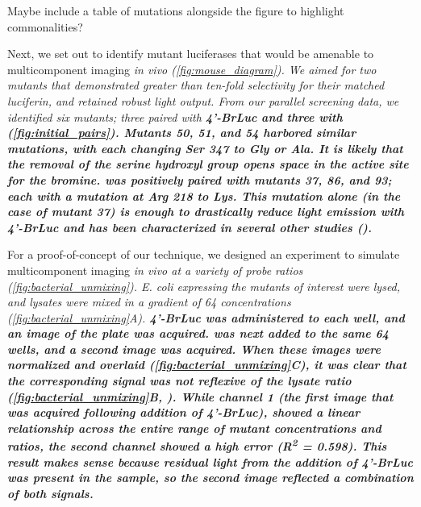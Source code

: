 \begin{thoughts}
  Maybe include a table of mutations alongside the figure to highlight commonalities?
\end{thoughts}

Next, we set out to identify mutant luciferases that would be amenable to multicomponent imaging \it{in vivo} (\autoref{fig:mouse_diagram}). We aimed for two mutants that demonstrated greater than ten-fold selectivity for their matched luciferin, and retained robust light output. From our parallel screening data, we identified six mutants; three paired with \bf{4'-BrLuc} and three with \dluc{} (\autoref{fig:initial_pairs}).
Mutants 50, 51, and 54 harbored similar mutations, with each changing Ser 347 to Gly or Ala. It is likely that the removal of the serine hydroxyl group opens space in the active site for the bromine.
\dluc{} was positively paired with mutants 37, 86, and 93; each with a mutation at Arg 218 to Lys. This mutation alone (in the case of mutant 37) is enough to drastically reduce light emission with \bf{4'-BrLuc} and has been characterized in several other studies ().

For a proof-of-concept of our technique, we designed an experiment to simulate multicomponent imaging \it{in vivo} at a variety of probe ratios (\autoref{fig:bacterial_unmixing}). \it{E. coli} expressing the mutants of interest were lysed, and lysates were mixed in a gradient of 64 concentrations (\autoref{fig:bacterial_unmixing}A). \bf{4'-BrLuc} was administered to each well, and an image of the plate was acquired. \dluciferin{} was next added to the same 64 wells, and a second image was acquired.
When these images were normalized and overlaid (\autoref{fig:bacterial_unmixing}C), it was clear that the corresponding signal was not reflexive of the lysate ratio (\autoref{fig:bacterial_unmixing}B, ). While channel 1 (the first image that was acquired following addition of \bf{4'-BrLuc}), showed a linear relationship across the entire range of mutant concentrations and ratios, the second channel showed a high error (R\textsuperscript{2} = 0.598).
This result makes sense because residual light from the addition of \bf{4'-BrLuc} was present in the sample, so the second image reflected a combination of both signals.

